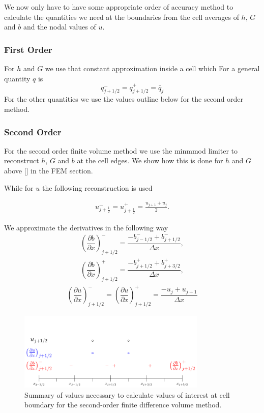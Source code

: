 We now only have to have some appropriate order of accuracy method to calculate the quantities we need at the boundaries from the cell averages of $h$, $G$ and $b$ and the nodal values of $u$.

\subsubsection{First Order}
For $h$ and $G$ we use that constant approximation inside a cell which
For a general quantity $q$ is
\begin{equation}
	q^-_{j + 1/2} = q^+_{j + 1/2} =  \bar{q}_j
\end{equation}
For the other quantities we use the values outline below for the second order method. 


\subsubsection{Second Order}

For the second order finite volume method we use the minmmod limiter to reconstruct $h$, $G$ and $b$ at the cell edges. We show how this is done for $h$ and $G$ above [] in the FEM section. 

While for $u$ the following reconstruction is used

\begin{gather}
u^-_{j + \frac{1}{2}} =  u^+_{j + \frac{1}{2}} =\frac{u_{j+1} + u_j}{2}.
\end{gather}

We approximate the derivatives in the following way
\begin{gather}
\left( \dfrac{\partial b}{\partial x}\right)^-_{j+1/2} = \dfrac{- {b}^-_{j-1/2} + {b}^-_{j+1/2} }{\Delta x},
\end{gather}
\begin{gather}
\left( \dfrac{\partial b}{\partial x}\right)^+_{j+1/2} =\dfrac { - {b}^+_{j+1/2} + {b}^+_{j+3/2} }{\Delta x},
\end{gather}
\begin{gather}
 \left( \dfrac{\partial u}{\partial x}\right)^-_{j+1/2} = \left( \dfrac{\partial u}{\partial x}\right)^+_{j+1/2}= \dfrac{ - u_{j} + u_{j+1} }{\Delta x}
\end{gather}

\begin{figure}
	\centering
	\includegraphics[width=0.8\textwidth]{./chp3/figures/2ndorderrecon.pdf}
	\caption{Summary of values necessary to calculate values of interest at cell boundary for the second-order finite difference volume method.}
	\label{fig:2ndorderrecon}
\end{figure}

